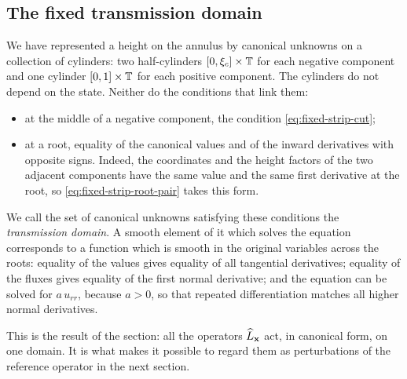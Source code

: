 \subsection{The fixed transmission domain}
\label{subsec:transmission-domain}

We have represented a height on the annulus by canonical unknowns on a
collection of cylinders: two half-cylinders
$[0,\xi_c]\times\mathbb T$ for each negative component and one cylinder
$[0,1]\times\mathbb T$ for each positive component. The cylinders do not
depend on the state. Neither do the conditions that link them:
\begin{itemize}
\item at the middle of a negative component, the condition
 \eqref{eq:fixed-strip-cut};
\item at a root, equality of the canonical values and of the inward
 derivatives with opposite signs. Indeed, the coordinates and the
 height factors of the two adjacent components have the same value
 and the same first derivative at the root, so
 \eqref{eq:fixed-strip-root-pair} takes this form.
\end{itemize}
We call the set of canonical unknowns satisfying these conditions the
\emph{transmission domain}. A smooth element of it which solves the
equation corresponds to a function which is smooth in the original
variables across the roots: equality of the values gives equality of
all tangential derivatives; equality of the fluxes gives equality of
the first normal derivative; and the equation can be solved for
$a\,u_{rr}$, because $a>0$, so that repeated differentiation matches
all higher normal derivatives.

This is the result of the section: all the operators
$\widehat L_{\mathbf x}$ act, in canonical form, on one domain. It is what
makes it possible to regard them as perturbations of the reference
operator in the next section.
